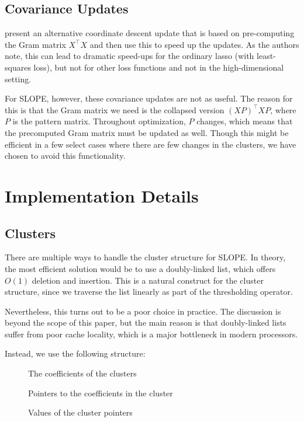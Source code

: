 \documentclass[article]{jss}
\begin{document}
\subsection{Covariance Updates}

\citet{friedman2010} present an alternative coordinate descent update that is
based on pre-computing the Gram matrix \(X^\intercal X\) and then use this to
speed up the updates. As the authors note, this can lead to dramatic speed-ups
for the ordinary lasso (with least-squares loss), but not for other loss
functions and not in the high-dimensional setting.

For SLOPE, however, these covariance updates are not as useful. The
reason for this is that the Gram matrix we need is the collapsed
version \((XP)^\intercal XP\), where \(P\) is the pattern matrix.
Throughout optimization, \(P\) changes, which means that the
precomputed Gram matrix must be updated as well. Though this
might be efficient in a few select cases where there are few
changes in the clusters, we have chosen to avoid this
functionality.

\section{Implementation Details}

\subsection{Clusters}

There are multiple ways to handle the cluster structure for SLOPE.
In theory, the most efficient solution would be to use a
doubly-linked list, which offers \(O(1)\) deletion and insertion.
This is a natural construct for the cluster structure, since we
traverse the list linearly as part of the thresholding operator.

Nevertheless, this turns out to be a poor choice in practice.
The discussion is beyond the scope of this paper, but the main
reason is that doubly-linked lists suffer from poor cache
locality, which is a major bottleneck in modern processors.

Instead, we use the following structure:

\begin{description}
  \item[] The coefficients of the clusters
  \item[] Pointers to the coefficients in the cluster
  \item[] Values of the cluster pointers
\end{description}
\end{document}
